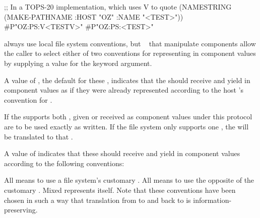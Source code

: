 \code
 ;; In a TOPS-20 implementation, which uses {\hat}V to quote 
 (NAMESTRING (MAKE-PATHNAME :HOST "OZ" :NAME "<TEST>"))
\EV #P"OZ:PS:{\hat}V<TEST{\hat}V>"
\NV #P"OZ:PS:<TEST>"
\endcode

 
\endsubsubsubsection%



 always use local file system  conventions, 
but \clisp\  that manipulate  components
allow the caller to select either of two conventions for representing
 in component values by supplying a value for the
 keyword argument.


A value of , the default for these , indicates that the
 should receive and yield  in component values
as if they were already represented according to the host 's 
convention for .

If the  supports both ,  given or received
as  component values under this protocol are to be used exactly
as written.  If the file system only supports one , 
the  will be translated to that .

\endsubsubsubsubsection%


A value of  indicates that these  should receive 
and yield  in component values according to the following conventions:

\beginlist
\itemitem{\bull}
All  means to use a file system's customary .
\itemitem{\bull}
All  means to use the opposite of the customary .
\itemitem{\bull}
Mixed  represents itself.
\endlist
Note that these conventions have been chosen in such a way that translation
from  to  and back to  is information-preserving.
 
